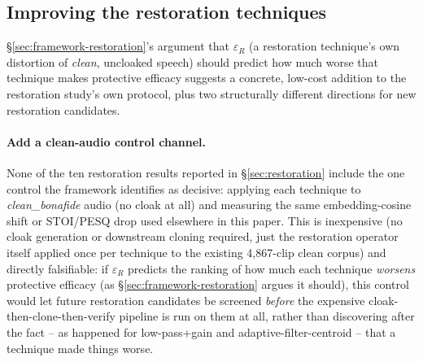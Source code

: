 \documentclass[11pt]{article}
\begin{document}
\subsection{Improving the restoration techniques}
\label{sec:framework-improve-restoration}
\S\ref{sec:framework-restoration}'s argument that $\varepsilon_R$
(a restoration technique's own distortion of \emph{clean}, uncloaked
speech) should predict how much worse that technique makes protective
efficacy suggests a concrete, low-cost addition to the restoration
study's own protocol, plus two structurally different directions for
new restoration candidates.

\paragraph{Add a clean-audio control channel.} None of the ten
restoration results reported in \S\ref{sec:restoration} include the
one control the framework identifies as decisive: applying each
technique to \emph{clean\_bonafide} audio (no cloak at all) and
measuring the same embedding-cosine shift or STOI/PESQ drop used
elsewhere in this paper. This is inexpensive (no cloak generation or
downstream cloning required, just the restoration operator itself
applied once per technique to the existing 4,867-clip clean corpus)
and directly falsifiable: if $\varepsilon_R$ predicts the ranking of
how much each technique \emph{worsens} protective efficacy (as
\S\ref{sec:framework-restoration} argues it should), this control would
let future restoration candidates be screened \emph{before} the
expensive cloak-then-clone-then-verify pipeline is run on them at all,
rather than discovering after the fact -- as happened for
low-pass+gain and adaptive-filter-centroid -- that a technique made
things worse.
\end{document}

